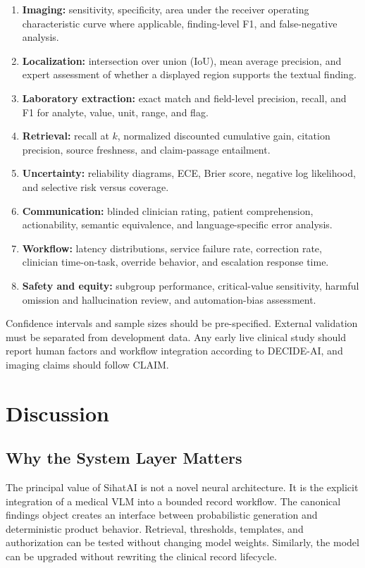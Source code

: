 \documentclass[conference]{IEEEtran}
\begin{document}
\begin{enumerate}
    \item \textbf{Imaging:} sensitivity, specificity, area under the receiver operating characteristic curve where applicable, finding-level F1, and false-negative analysis.
    \item \textbf{Localization:} intersection over union (IoU), mean average precision, and expert assessment of whether a displayed region supports the textual finding.
    \item \textbf{Laboratory extraction:} exact match and field-level precision, recall, and F1 for analyte, value, unit, range, and flag.
    \item \textbf{Retrieval:} recall at \(k\), normalized discounted cumulative gain, citation precision, source freshness, and claim-passage entailment.
    \item \textbf{Uncertainty:} reliability diagrams, ECE, Brier score, negative log likelihood, and selective risk versus coverage.
    \item \textbf{Communication:} blinded clinician rating, patient comprehension, actionability, semantic equivalence, and language-specific error analysis.
    \item \textbf{Workflow:} latency distributions, service failure rate, correction rate, clinician time-on-task, override behavior, and escalation response time.
    \item \textbf{Safety and equity:} subgroup performance, critical-value sensitivity, harmful omission and hallucination review, and automation-bias assessment.
\end{enumerate}

Confidence intervals and sample sizes should be pre-specified. External validation must be separated from development data. Any early live clinical study should report human factors and workflow integration according to DECIDE-AI, and imaging claims should follow CLAIM.

\section{Discussion}

\subsection{Why the System Layer Matters}

The principal value of SihatAI is not a novel neural architecture. It is the explicit integration of a medical VLM into a bounded record workflow. The canonical findings object creates an interface between probabilistic generation and deterministic product behavior. Retrieval, thresholds, templates, and authorization can be tested without changing model weights. Similarly, the model can be upgraded without rewriting the clinical record lifecycle.
\end{document}
